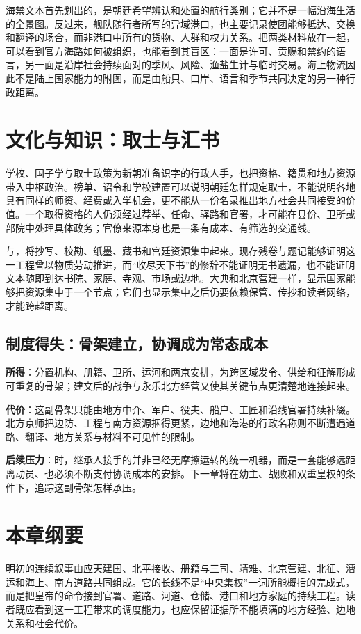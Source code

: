 海禁文本首先划出的，是朝廷希望辨认和处置的航行类别；它并不是一幅沿海生活的全景图。反过来，舰队随行者所写的异域港口，也主要记录使团能够抵达、交换和翻译的场合，而非港口中所有的货物、人群和权力关系。把两类材料放在一起，可以看到官方海路如何被组织，也能看到其盲区：一面是许可、贡赐和禁约的语言，另一面是沿岸社会持续面对的季风、风险、渔盐生计与临时交易。海上物流因此不是陆上国家能力的附图，而是由船只、口岸、语言和季节共同决定的另一种行政距离。
\section{文化与知识：取士与汇书}

学校、国子学与取士政策为新朝准备识字的行政人手，也把资格、籍贯和地方资源带入中枢政治。榜单、诏令和学校建置可以说明朝廷怎样规定取士，不能说明各地具有同样的师资、经费或入学机会，更不能从一份名录推出地方社会共同接受的价值。一个取得资格的人仍须经过荐举、任命、驿路和官署，才可能在县份、卫所或部院中处理具体政务；官僚来源本身也是一条有成本、有筛选的交通线。

与，将抄写、校勘、纸墨、藏书和宫廷资源集中起来。现存残卷与题记能够证明这一工程曾以物质劳动推进，而“收尽天下书”的修辞不能证明无书遗漏，也不能证明文本随即到达书院、家庭、寺观、市场或边地。大典和北京营建一样，显示国家能够把资源集中于一个节点；它们也显示集中之后仍要依赖保管、传抄和读者网络，才能跨越距离。

\subsection{制度得失：骨架建立，协调成为常态成本}
\textbf{所得}：分置机构、册籍、卫所、运河和两京安排，为跨区域发令、供给和征解形成可重复的骨架；建文后的战争与永乐北方经营又使其关键节点更清楚地连接起来。

\textbf{代价}：这副骨架只能由地方中介、军户、役夫、船户、工匠和沿线官署持续补缀。北方京师把边防、工程与南方资源捆得更紧，边地和海港的行政名称则不断遭遇道路、翻译、地方关系与材料不可见性的限制。

\textbf{后续压力}：时，继承人接手的并非已经无摩擦运转的统一机器，而是一套能够远距离动员、也必须不断支付协调成本的安排。下一章将在幼主、战败和双重皇权的条件下，追踪这副骨架怎样承压。

\section{本章纲要}

明初的连续叙事由应天建国、北平接收、册籍与三司、靖难、北京营建、北征、漕运和海上、南方道路共同组成。它的长线不是“中央集权”一词所能概括的完成式，而是把皇帝的命令接到官署、道路、河道、仓储、港口和地方家庭的持续工程。读者既应看到这一工程带来的调度能力，也应保留证据所不能填满的地方经验、边地关系和社会代价。
